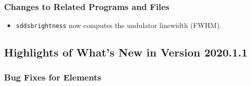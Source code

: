\documentclass[11pt]{article}
\begin{document}
\subsubsection{Changes to Related Programs and Files}

\begin{itemize}
\item \verb|sddsbrightness| now computes the undulator linewidth (FWHM).
\end{itemize}


\subsection{Highlights of What's New in Version 2020.1.1}

\subsubsection{Bug Fixes for Elements}
\end{document}
